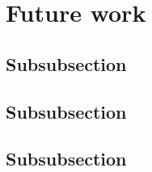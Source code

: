 \section{Future work}
\label{sec62}


\lipsum[1]

\subsection{Subsubsection}
\label{sec621}

\lipsum[1]

\subsection{Subsubsection}
\label{sec622}

\lipsum[1]

\subsection{Subsubsection}
\label{sec623}

\lipsum[1]
